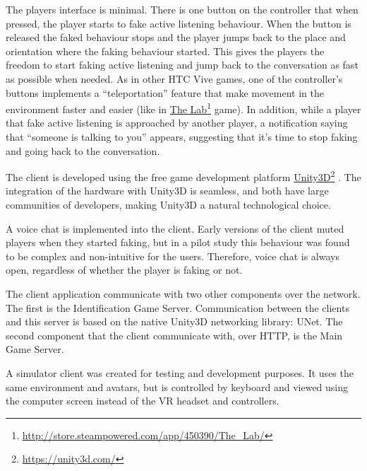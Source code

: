 \documentclass[]{simple-thesis}
\newcommand\fnurl[2]{%
  \href{#2}{#1}\footnote{\url{#2}}%
}
\begin{document}
The players interface is minimal.
There is one button on the controller that when pressed, the player starts to fake active listening behaviour.
When the button is released the faked behaviour stops and the player jumps back to the place and orientation where the faking behaviour started.
This gives the players the freedom to start faking active listening and jump back to the conversation as fast as possible when needed.
As in other HTC Vive games, one of the controller's buttons implements a ``teleportation'' feature that make movement in the environment faster and easier (like in \fnurl{The Lab}{http://store.steampowered.com/app/450390/The_Lab/} game).
In addition, while a player that fake active listening is approached by another player, a notification saying that ``someone is talking to you'' appears, suggesting that it's time to stop faking and going back to the conversation.

The client is developed using the free game development platform \fnurl{Unity3D}{https://unity3d.com/}.
The integration of the hardware with Unity3D is seamless, and both have large communities of developers, making Unity3D a natural technological choice.

A voice chat is implemented into the client.
Early versions of the client muted players when they started faking, but in a pilot study this behaviour was found to be complex and non-intuitive for the users.
Therefore, voice chat is always open, regardless of whether the player is faking or not.

The client application communicate with two other components over the network.
The first is the Identification Game Server.
Communication between the clients and this server is based on the native Unity3D networking library: UNet.
The second component that the client communicate with, over HTTP, is the Main Game Server.

A simulator client was created for testing and development purposes.
It uses the same environment and avatars, but is controlled by keyboard and viewed using the computer screen instead of the VR headset and controllers.
\end{document}

